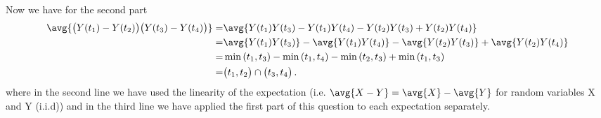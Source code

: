 Now we have for the second part
\begin{align*}
  \avg{ \big( Y(t_1) - Y(t_2) \big)  \big( Y(t_3) - Y(t_4) \big) }
  = & \avg{ Y(t_1)Y(t_3) - Y(t_1)Y(t_4) - Y(t_2)Y(t_3) + Y(t_2)Y(t_4) } \\
  = & \avg{Y(t_1)Y(t_3) } - \avg{Y(t_1)Y(t_4)} - \avg{Y(t_2)Y(t_3)} + \avg{ Y(t_2)Y(t_4)}  \\
  = & \min{(t_1,t_3)} - \min{(t_1,t_4)} - \min{(t_2,t_3)} + \min{(t_1,t_3)}  \\
  = & \big( t_1, t_2 \big) \cap \big( t_3, t_4 \big)
  \, .
\end{align*}
where in the second line we have used the linearity of the expectation (i.e. $\avg{ X - Y } = \avg{X} - \avg{Y}$ for random variables X and Y (i.i.d)) and in the third line we have applied the first part of this question to each expectation separately.
